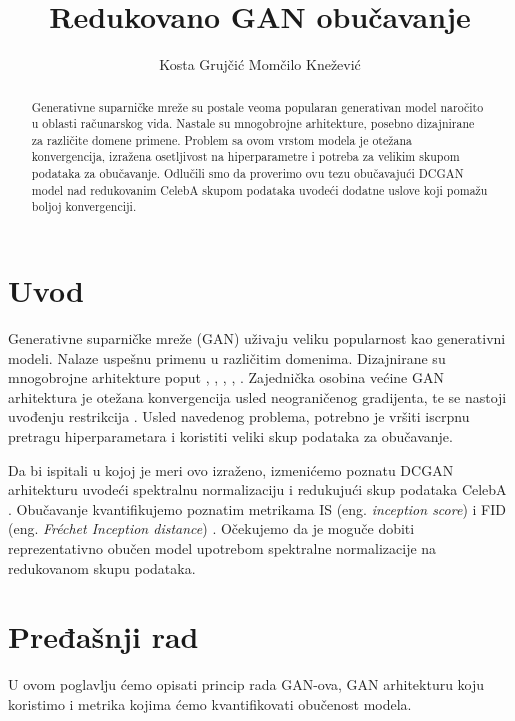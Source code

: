 \documentclass[12pt, a4paper]{article}
\begin{document}
\date{}
\title{Redukovano GAN obučavanje}
\author{Kosta Grujčić \hspace{25pt} Momčilo Knežević}
\maketitle

\begin{abstract}
Generativne suparničke mreže su postale veoma popularan generativan model naročito u oblasti računarskog vida. Nastale su mnogobrojne arhitekture, posebno dizajnirane za različite domene primene. Problem sa ovom vrstom modela je otežana konvergencija, izražena osetljivost na hiperparametre i potreba za velikim skupom podataka za obučavanje. Odlučili smo da proverimo ovu tezu obučavajući DCGAN model nad redukovanim CelebA skupom podataka uvodeći dodatne uslove koji pomažu boljoj konvergenciji.
\end{abstract}

\section{Uvod}
Generativne suparničke mreže (GAN) \cite{GAN-2014} uživaju veliku popularnost kao generativni modeli. Nalaze uspešnu primenu u različitim domenima. Dizajnirane su mnogobrojne arhitekture poput \cite{DCGAN-2016}, \cite{WGAN-2017}, \cite{CGAN-2014}, \cite{StyleGAN-2018}, \cite{StyleGAN2-2019}. Zajednička osobina većine GAN arhitektura je otežana konvergencija usled neograničenog gradijenta, te se nastoji uvođenju restrikcija \cite{Lipschitz-2017}. Usled navedenog problema, potrebno je vršiti iscrpnu pretragu hiperparametara i koristiti veliki skup podataka za obučavanje.

Da bi ispitali u kojoj je meri ovo izraženo, izmenićemo poznatu DCGAN arhitekturu uvodeći spektralnu normalizaciju \cite{SN-2018} i redukujući skup podataka CelebA \cite{CelebA-2015}. Obučavanje kvantifikujemo poznatim metrikama IS (eng. \textit{inception score}) \cite{IS-2016} i FID (eng. \textit{Fréchet Inception distance}) \cite{FID-2017}. Očekujemo da je moguče dobiti reprezentativno obučen model upotrebom spektralne normalizacije na redukovanom skupu podataka.

\section{Pređašnji rad}
U ovom poglavlju ćemo opisati princip rada GAN-ova, GAN arhitekturu koju koristimo i metrika kojima ćemo kvantifikovati obučenost modela.
\end{document}
